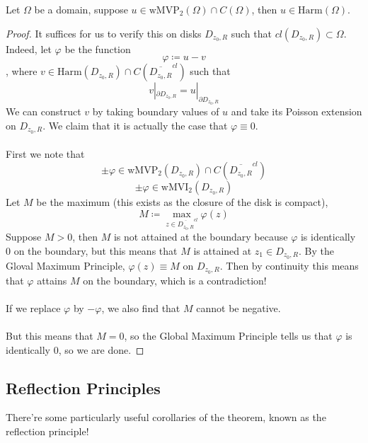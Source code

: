 \documentclass{article}
\begin{document}
\begin{theorem}
    Let $\Omega$ be a domain, suppose $u \in \text{wMVP}_2(\Omega) \cap C(\Omega)$, then $u \in \text{Harm}(\Omega)$. 
\end{theorem}

\begin{proof}
    It suffices for us to verify this on disks $D_{z_0, R}$ such that $cl(D_{z_0, R}) \subset \Omega$. Indeed, let $\varphi$ be the function
    \[\varphi \coloneqq u - v\]
    , where $v \in \text{Harm}(D_{z_0, R}) \cap C(\overline{D_{z_0, R}}^{cl})$ such that
    \[v|_{\partial D_{z_0, R}} = u|_{\partial D_{z_0, R}}\]
    We can construct $v$ by taking boundary values of $u$ and take its Poisson extension on $D_{z_0, R}$. We claim that it is actually the case that $\varphi \equiv 0$.\\\\
    First we note that
    \[\pm \varphi \in \text{wMVP}_2(D_{z_0, R}) \cap C(\overline{D_{z_0, R}}^{cl})\]
    \[\pm \varphi \in \text{wMVI}_2(D_{z_0, R})\]
    Let $M$ be the maximum (this exists as the closure of the disk is compact),
    \[M \coloneqq \max_{z \in \overline{D_{z_0, R}}^{cl}} \varphi(z)\]
    Suppose $M > 0$, then $M$ is not attained at the boundary because $\varphi$ is identically $0$ on the boundary, but this means that $M$ is attained at $z_1 \in D_{z_0, R}$. By the Gloval Maximum Principle, $\varphi(z) \equiv M$ on $D_{z_0, R}$. Then by continuity this means that $\varphi$ attains $M$ on the boundary, which is a contradiction!\\\\
    If we replace $\varphi$ by $-\varphi$, we also find that $M$ cannot be negative.\\\\
    But this means that $M = 0$, so the Global Maximum Principle tells us that $\varphi$ is identically $0$, so we are done.
\end{proof}

\subsection{Reflection Principles}

There're some particularly useful corollaries of the theorem, known as the reflection principle!
\end{document}
